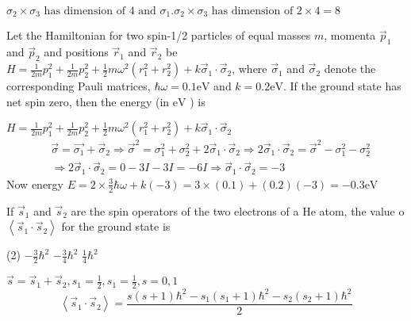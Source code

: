 \begin{enumerate}
\begin{answer}
	$\sigma_{2} \times \sigma_{3} \text { has dimension of } 4 \text { and } \sigma_{1} . \sigma_{2} \times \sigma_{3} \text { has dimension of } 2 \times 4=8$
\end{answer}
\begin{minipage}{\textwidth}
	\item Let the Hamiltonian for two spin-1/2 particles of equal masses $m$, momenta $\vec{p}_{1}$ and $\vec{p}_{2}$ and positions $\vec{r}_{1}$ and $\vec{r}_{2}$ be $H=\frac{1}{2 m} p_{1}^{2}+\frac{1}{2 m} p_{2}^{2}+\frac{1}{2} m \omega^{2}\left(r_{1}^{2}+r_{2}^{2}\right)+k \vec{\sigma}_{1} \cdot \vec{\sigma}_{2}$, where $\vec{\sigma}_{1}$ and $\vec{\sigma}_{2}$ denote the corresponding Pauli matrices, $\hbar \omega=0.1 \mathrm{eV}$ and $k=0.2 \mathrm{eV}$. If the ground state has net spin zero, then the energy (in $\mathrm{eV}$ ) is
\end{minipage}
\begin{answer}
$H=\frac{1}{2 m} p_{1}^{2}+\frac{1}{2 m} p_{2}^{2}+\frac{1}{2} m \omega^{2}\left(r_{1}^{2}+r_{2}^{2}\right)+k \vec{\sigma}_{1} \cdot \vec{\sigma}_{2}$
\begin{align*}
&\vec{\sigma}=\overrightarrow{\sigma_{1}}+\vec{\sigma}_{2} \Rightarrow \vec{\sigma}^{2}=\sigma_{1}^{2}+\sigma_{2}^{2}+2 \vec{\sigma}_{1} \cdot \vec{\sigma}_{2} \Rightarrow 2 \vec{\sigma}_{1} \cdot \vec{\sigma}_{2}=\vec{\sigma}^{2}-\sigma_{1}^{2}-\sigma_{2}^{2} \\
&\Rightarrow 2 \vec{\sigma}_{1} \cdot \vec{\sigma}_{2}=0-3 I-3 I=-6 I \Rightarrow \vec{\sigma}_{1} \cdot \vec{\sigma}_{2}=-3
\end{align*}
Now energy $E=2 \times \frac{3}{2} \hbar \omega+k(-3)=3 \times(0.1)+(0.2)(-3)=-0.3 \mathrm{eV}$	
\end{answer}
\begin{minipage}{\textwidth}
	\item If $\vec{s}_{1}$ and $\vec{s}_{2}$ are the spin operators of the two electrons of a He atom, the value o $\left\langle\vec{s}_{1} \cdot \vec{s}_{2}\right\rangle$ for the ground state is
\end{minipage}
\begin{tasks}(2)
	\task[\textbf{A.}] $-\frac{3}{2} \hbar^{2}$
	\task[\textbf{B.}]$-\frac{3}{4} \hbar^{2}$
	\task[\textbf{D.}] $\frac{1}{4} \hbar^{2}$
\end{tasks}
\begin{answer}
	$\vec{s}=\vec{s}_{1}+\vec{s}_{2}, s_{1}=\frac{1}{2}, s_{1}=\frac{1}{2}, s=0,1$\\ $$\left\langle\vec{s}_{1} \cdot \vec{s}_{2}\right\rangle=\frac{s(s+1) \hbar^{2}-s_{1}\left(s_{1}+1\right) \hbar^{2}-s_{2}\left(s_{2}+1\right) \hbar^{2}}{2}$$

\end{answer}
\end{enumerate}
